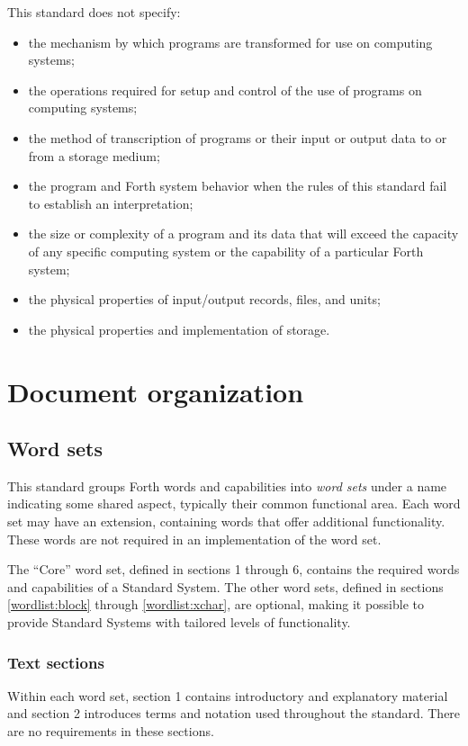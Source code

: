 This standard does not specify:
\begin{itemize}
\item the mechanism by which programs are transformed for use on
	computing systems;
\item the operations required for setup and control of the use of
	programs on computing systems;
\item the method of transcription of programs or their input or
	output data to or from a storage medium;
\item the program and Forth system behavior when the rules of this
	standard fail to establish an interpretation;
\item the size or complexity of a program and its data that will
	exceed the capacity of any specific computing system or the
	capability of a particular Forth system;
\item the physical properties of input/output records, files, and units;
\item the physical properties and implementation of storage.
\end{itemize}

\section{Document organization}
\label{intro:wordsets}

\subsection{Word sets}
This standard groups Forth words and capabilities into \emph{word sets}
under a name indicating some shared aspect, typically their common
functional area. Each word set may have an extension, containing words
that offer additional functionality. These words are not required in an
implementation of the word set.

The ``Core'' word set, defined in sections 1 through 6, contains the
required words and capabilities of a Standard System. The other word
sets, defined in sections \ref{wordlist:block} through
\ref{wordlist:xchar}, are optional, making it possible to provide
Standard Systems with tailored levels of functionality.

\subsubsection{Text sections}
\label{intro:numbering}

Within each word set, section 1 contains introductory and explanatory
material and section 2 introduces terms and notation used throughout
the standard. There are no requirements in these sections.


